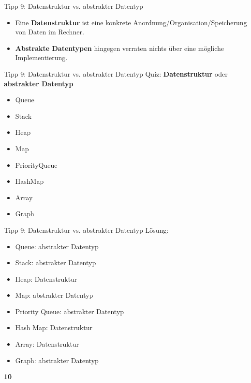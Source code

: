 \documentclass[18pt]{beamer}
\begin{document}
\begin{frame}{Tipp 9: Datenstruktur vs. abstrakter Datentyp}
    \begin{itemize}
        \item Eine \textbf{Datenstruktur} ist eine konkrete Anordnung/Organisation/Speicherung von Daten im Rechner.
        \vspace{.2in}
        \item \textbf{Abstrakte Datentypen} hingegen verraten nichts über eine mögliche Implementierung.
    \end{itemize}
\end{frame}

\begin{frame}{Tipp 9: Datenstruktur vs. abstrakter Datentyp}
    Quiz: \textbf{Datenstruktur} oder \textbf{abstrakter Datentyp}
    \begin{itemize}
        \item Queue
        \item Stack
        \item Heap
        \item Map
        \item PriorityQueue
        \item HashMap
        \item Array
        \item Graph
    \end{itemize}
\end{frame}

\begin{frame}{Tipp 9: Datenstruktur vs. abstrakter Datentyp}
    Lösung:
    \begin{itemize}
        \item Queue: \alert{abstrakter Datentyp}
        \item Stack: \alert{abstrakter Datentyp}
        \item Heap: \alert{Datenstruktur}
        \item Map: \alert{abstrakter Datentyp}
        \item Priority Queue: \alert{abstrakter Datentyp}
        \item Hash Map: \alert{Datenstruktur}
        \item Array: \alert{Datenstruktur}
        \item Graph: \alert{abstrakter Datentyp}
    \end{itemize}
\end{frame}

\begin{frame}{\quad}
    \center
    \Huge{\textbf{10}}
\end{frame}
\end{document}
